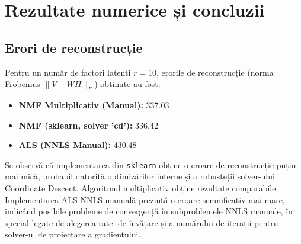 \documentclass[12pt,a4paper]{article}
\begin{document}
\section{Rezultate numerice și concluzii}

\subsection{Erori de reconstrucție}
Pentru un număr de factori latenti $r=10$, erorile de reconstrucție (norma Frobenius $\|V - WH\|_F$) obținute au fost:
\begin{itemize}
\item \textbf{NMF Multiplicativ (Manual):} 337.03
\item \textbf{NMF (sklearn, solver 'cd'):} 336.42
\item \textbf{ALS (NNLS Manual):} 430.48
\end{itemize}
Se observă că implementarea din \texttt{sklearn} obține o eroare de reconstrucție puțin mai mică, probabil datorită optimizărilor interne și a robusteții solver-ului Coordinate Descent. Algoritmul multiplicativ obține rezultate comparabile. Implementarea ALS-NNLS manuală prezintă o eroare semnificativ mai mare, indicând posibile probleme de convergență în subproblemele NNLS manuale, în special legate de alegerea ratei de învățare și a numărului de iterații pentru solver-ul de proiectare a gradientului.
\end{document}
